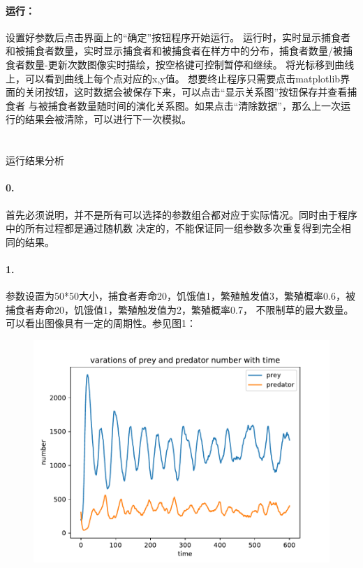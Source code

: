 \documentclass[a4paper]{ctexart}
\makeatletter
\renewcommand{\section}{\@startsection{section}{1}{0mm}
	{-\baselineskip}{0.5\baselineskip}{\bf\leftline}}
\makeatother
\begin{document}
		\paragraph{运行：}
		设置好参数后点击界面上的“确定”按钮程序开始运行。
		运行时，实时显示捕食者和被捕食者数量，实时显示捕食者和被捕食者在样方中的分布，捕食者数量/被捕食者数量-更新次数图像实时描绘，按空格键可控制暂停和继续。
		将光标移到曲线上，可以看到曲线上每个点对应的x,y值。
		想要终止程序只需要点击matplotlib界面的关闭按钮，这时数据会被保存下来，可以点击“显示关系图”按钮保存并查看捕食者
		与被捕食者数量随时间的演化关系图。如果点击“清除数据”，那么上一次运行的结果会被清除，可以进行下一次模拟。\\
		\\
		\\
	\section{\Large{运行结果分析}}
	\paragraph{0.}首先必须说明，并不是所有可以选择的参数组合都对应于实际情况。同时由于程序中的所有过程都是通过随机数
	决定的，不能保证同一组参数多次重复得到完全相同的结果。
	\paragraph{1.}
	参数设置为50*50大小，捕食者寿命20，饥饿值1，繁殖触发值3，繁殖概率0.6，被捕食者寿命20，饥饿值1，繁殖触发值为2，繁殖概率0.7，
	不限制草的最大数量。
	可以看出图像具有一定的周期性。参见图1：
	\begin{figure}[htbp]
		\centering
		\includegraphics[scale=0.6]{demo1.pdf}
		\caption{}
	\end{figure}
\end{document}
